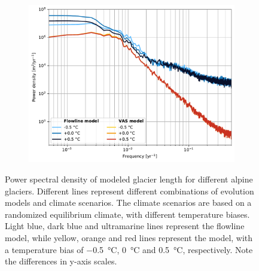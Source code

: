 \begin{figure}[htp]
\begin{subfigure}[b]{0.48\textwidth}
          \includegraphics[width=\textwidth]{../plots/final_plots/psd/Rhonegletscher.pdf}
        \end{subfigure}

        \caption{Power spectral density of modeled glacier length for different alpine glaciers. Different lines represent different combinations of evolution models and climate scenarios. The climate scenarios are based on a randomized equilibrium climate, with different temperature biases. Light blue, dark blue and ultramarine lines represent the flowline model, while yellow, orange and red lines represent the \vas{} model, with a temperature bias of \SI{-.5}{\celsius}, \SI{0}{\celsius} and \SI{+.5}{\celsius}, respectively. Note the differences in y-axis scales.}
        \label{fig:psd}
      \end{figure}

